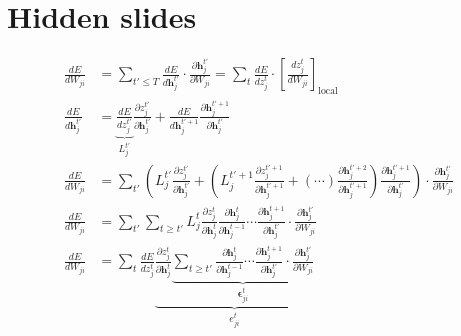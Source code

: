 \documentclass[t]{beamer}
\begin{document}
\section{Hidden slides}
\begin{frame}{}
  \footnotesize
  \begin{align}
  \frac{dE}{dW_{ji}} &= \sum_{t' \leq T}\frac{dE}{d\mathbf{h}_j^{t'}}\cdot\frac{\partial \mathbf{h}_j^{t'}}{\partial W_{ji}} =
  \sum_t\frac{dE}{dz_j^t}\cdot\left[\frac{dz_j^t}{dW_{ji}}\right]_\text{local}\\
  \frac{dE}{d\mathbf{h}_j^{t'}} &= \underbrace{\frac{dE}{dz_j^{t'}}}_{L^{t'}_j} \frac{\partial z_j^{t'}}{\partial\mathbf{h}_j^{t'}} + \frac{dE}{d\mathbf{h}_j^{t'+1}}\frac{\partial\mathbf{h}_j^{t'+1}}{\partial\mathbf{h}_j^{t'}}\\
  \frac{dE}{dW_{ji}} &= \sum_{t'}\left(L_j^{t'}\frac{\partial z_j^{t'}}{\partial\mathbf{h}_j^{t'}} + \left( L^{t'+1}_j \frac{\partial z_j^{t'+1}}{\partial\mathbf{h}_j^{t'+1}} + (\cdots)\frac{\partial\mathbf{h}_j^{t'+2}}{\partial\mathbf{h}_j^{t'+1}}  \right) \frac{\partial\mathbf{h}_j^{t'+1}}{\partial\mathbf{h}_j^{t'}}\right)\cdot\frac{\partial\mathbf{h}_j^{t'}}{\partial W_{ji}}\\
  \frac{dE}{dW_{ji}} &= \sum_{t'}\sum_{t\geq t'}L^t_j\frac{\partial z_j^t}{\partial\mathbf{h}_j^t}\frac{\partial\mathbf{h}^t_j}{\partial\mathbf{h}_j^{t-1}} \cdots \frac{\partial\mathbf{h}_j^{t+1}}{\partial\mathbf{h}_j^{t'}}\cdot\frac{\partial\mathbf{h}_j^{t'}}{\partial W_{ji}}\\
  \frac{dE}{dW_{ji}} &= \sum_t\frac{dE}{dz_j^t}\underbrace{\frac{\partial z_j^t}{\partial\mathbf{h}_j^t}\underbrace{\sum_{t\geq t'}\frac{\partial\mathbf{h}^t_j}{\partial\mathbf{h}_j^{t-1}} \cdots \frac{\partial\mathbf{h}_j^{t+1}}{\partial\mathbf{h}_j^{t'}}\cdot\frac{\partial\mathbf{h}_j^{t'}}{\partial W_{ji}}}_{\bm{\epsilon}_{ji}^t}}_{e^t_{ji}}
  \end{align}
\end{frame}
\end{document}
